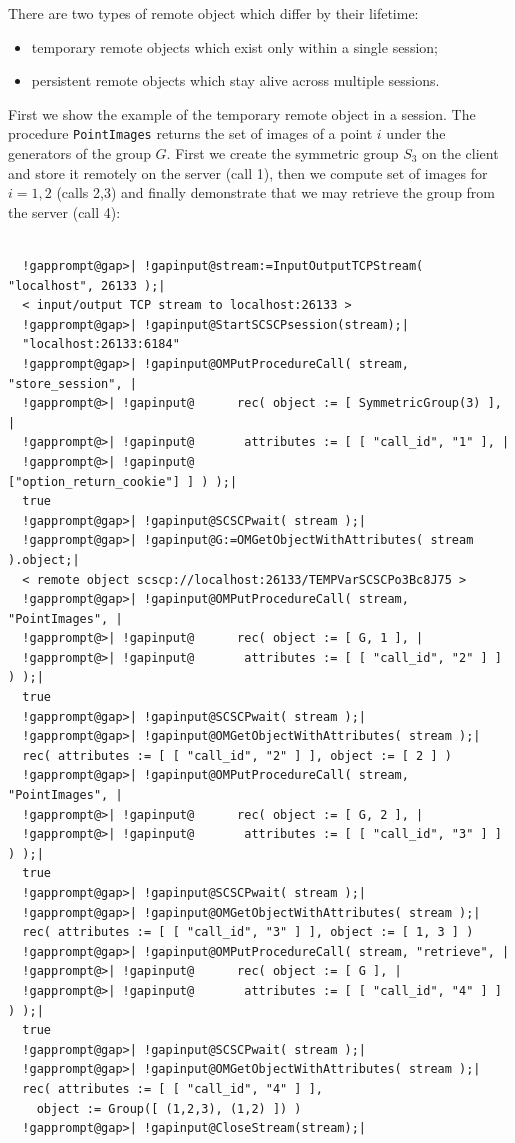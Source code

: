 \documentclass[a4paper,11pt]{report}
\begin{document}
{{ There are two types of remote object which differ by their lifetime: 
\begin{itemize}
\item temporary remote objects which exist only within a single session;
\item persistent remote objects which stay alive across multiple sessions.
\end{itemize}
 First we show the example of the temporary remote object in a session. The
procedure \texttt{PointImages} returns the set of images of a point $i$ under the generators of the group $G$. First we create the symmetric group $S_3$ on the client and store it remotely on the server (call 1), then we compute
set of images for $i=1,2$ (calls 2,3) and finally demonstrate that we may retrieve the group from the
server (call 4): 
\begin{Verbatim}[commandchars=!@|,fontsize=\small,frame=single,label=Example]
  
  !gapprompt@gap>| !gapinput@stream:=InputOutputTCPStream( "localhost", 26133 );|
  < input/output TCP stream to localhost:26133 >
  !gapprompt@gap>| !gapinput@StartSCSCPsession(stream);|
  "localhost:26133:6184"
  !gapprompt@gap>| !gapinput@OMPutProcedureCall( stream, "store_session", |
  !gapprompt@>| !gapinput@      rec( object := [ SymmetricGroup(3) ], |
  !gapprompt@>| !gapinput@       attributes := [ [ "call_id", "1" ], |
  !gapprompt@>| !gapinput@                       ["option_return_cookie"] ] ) );|
  true
  !gapprompt@gap>| !gapinput@SCSCPwait( stream );|
  !gapprompt@gap>| !gapinput@G:=OMGetObjectWithAttributes( stream ).object;|
  < remote object scscp://localhost:26133/TEMPVarSCSCPo3Bc8J75 >
  !gapprompt@gap>| !gapinput@OMPutProcedureCall( stream, "PointImages", |
  !gapprompt@>| !gapinput@      rec( object := [ G, 1 ], |
  !gapprompt@>| !gapinput@       attributes := [ [ "call_id", "2" ] ] ) );|
  true
  !gapprompt@gap>| !gapinput@SCSCPwait( stream );|
  !gapprompt@gap>| !gapinput@OMGetObjectWithAttributes( stream );|
  rec( attributes := [ [ "call_id", "2" ] ], object := [ 2 ] )
  !gapprompt@gap>| !gapinput@OMPutProcedureCall( stream, "PointImages", |
  !gapprompt@>| !gapinput@      rec( object := [ G, 2 ], |
  !gapprompt@>| !gapinput@       attributes := [ [ "call_id", "3" ] ] ) );|
  true
  !gapprompt@gap>| !gapinput@SCSCPwait( stream );|
  !gapprompt@gap>| !gapinput@OMGetObjectWithAttributes( stream );|
  rec( attributes := [ [ "call_id", "3" ] ], object := [ 1, 3 ] )
  !gapprompt@gap>| !gapinput@OMPutProcedureCall( stream, "retrieve", |
  !gapprompt@>| !gapinput@      rec( object := [ G ], |
  !gapprompt@>| !gapinput@       attributes := [ [ "call_id", "4" ] ] ) );|
  true
  !gapprompt@gap>| !gapinput@SCSCPwait( stream );|
  !gapprompt@gap>| !gapinput@OMGetObjectWithAttributes( stream );|
  rec( attributes := [ [ "call_id", "4" ] ], 
    object := Group([ (1,2,3), (1,2) ]) )
  !gapprompt@gap>| !gapinput@CloseStream(stream);|
  

\end{Verbatim}}}
\end{document}
